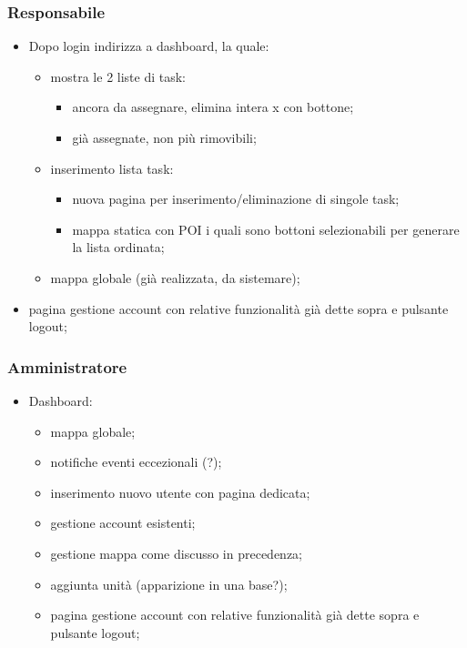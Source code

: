     \subsubsection{Responsabile}
        \begin{itemize}
            \item Dopo login indirizza a dashboard, la quale:
            \begin{itemize}
                \item mostra le 2 liste di task:
                \begin{itemize}
                    \item ancora da assegnare, elimina intera x con bottone;
                    \item già assegnate, non più rimovibili;
                \end{itemize}
                \item inserimento lista task:
                \begin{itemize}
                    \item nuova pagina per inserimento/eliminazione di singole task;
                    \item mappa statica con POI i quali sono bottoni selezionabili per generare la lista ordinata;
                \end{itemize}
                \item mappa globale (già realizzata, da sistemare);
            \end{itemize}
            \item pagina gestione account con relative funzionalità già dette sopra e pulsante logout;
        \end{itemize}

    \subsubsection{Amministratore}
    \begin{itemize}
        \item Dashboard:
        \begin{itemize}
            \item mappa globale;
            \item notifiche eventi eccezionali (?);
            \item inserimento nuovo utente con pagina dedicata;
            \item gestione account esistenti;
            \item gestione mappa come discusso in precedenza;
            \item aggiunta unità (apparizione in una base?);
            \item pagina gestione account con relative funzionalità già dette sopra e pulsante logout;
        \end{itemize}
    \end{itemize}




